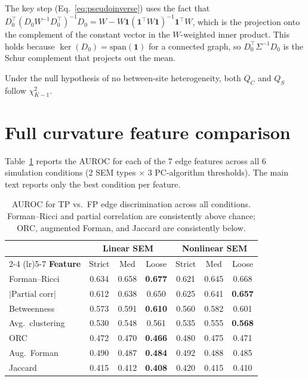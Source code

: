 \documentclass{article}
\begin{document}
The key step (Eq.~\ref{eq:pseudoinverse}) uses the fact that $D_0^\top (D_0 W^{-1} D_0^\top)^{-1} D_0 = W - W \mathbf{1}(\mathbf{1}^\top W \mathbf{1})^{-1} \mathbf{1}^\top W$, which is the projection onto the complement of the constant vector in the $W$-weighted inner product. This holds because $\ker(D_0) = \mathrm{span}(\mathbf{1})$ for a connected graph, so $D_0^\top \Sigma^{-1} D_0$ is the Schur complement that projects out the mean.

Under the null hypothesis of no between-site heterogeneity, both $Q_C$ and $Q_S$ follow $\chi^2_{K-1}$.

\section{Full curvature feature comparison}
\label{app:curvature}

Table~\ref{tab:curvature-full} reports the AUROC for each of the 7 edge features across all 6 simulation conditions (2 SEM types $\times$ 3 PC-algorithm thresholds). The main text reports only the best condition per feature.

\begin{table}[h]
\centering
\caption{AUROC for TP vs.\ FP edge discrimination across all conditions. Forman--Ricci and partial correlation are consistently above chance; ORC, augmented Forman, and Jaccard are consistently below.}
\label{tab:curvature-full}
\small
\begin{tabular}{@{}lcccccc@{}}
\toprule
& \multicolumn{3}{c}{\textbf{Linear SEM}} & \multicolumn{3}{c}{\textbf{Nonlinear SEM}} \\
\cmidrule(lr){2-4} \cmidrule(lr){5-7}
\textbf{Feature} & Strict & Med & Loose & Strict & Med & Loose \\
\midrule
Forman--Ricci & 0.634 & 0.658 & \textbf{0.677} & 0.621 & 0.645 & 0.668 \\
$|\text{Partial corr}|$ & 0.612 & 0.638 & 0.650 & 0.625 & 0.641 & \textbf{0.657} \\
Betweenness & 0.573 & 0.591 & \textbf{0.610} & 0.560 & 0.582 & 0.601 \\
Avg.\ clustering & 0.530 & 0.548 & 0.561 & 0.535 & 0.555 & \textbf{0.568} \\
\midrule
ORC & 0.472 & 0.470 & \textbf{0.466} & 0.480 & 0.475 & 0.471 \\
Aug.\ Forman & 0.490 & 0.487 & \textbf{0.484} & 0.492 & 0.488 & 0.485 \\
Jaccard & 0.415 & 0.412 & \textbf{0.408} & 0.420 & 0.415 & 0.410 \\
\bottomrule
\end{tabular}
\end{table}
\end{document}
